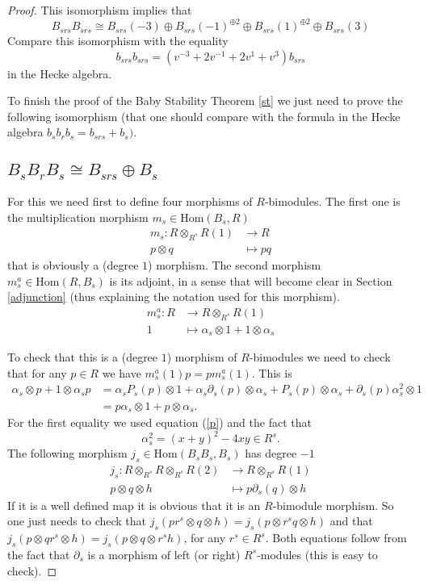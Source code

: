 \documentclass[12pt]{wart}
\theoremstyle{remark}
\def\del{\partial}
\begin{document}
\begin{proof}
This isomorphism implies  that 
\begin{equation}\label{w0}
B_{srs}B_{srs}\cong B_{srs}(-3)\oplus B_{srs}(-1)^{\oplus 2}\oplus B_{srs}(1)^{\oplus 2}\oplus B_{srs}(3)
\end{equation}
Compare this isomorphism with the equality $$b_{srs}b_{srs}=(v^{-3}+2v^{-1}+2v^{1}+v^3)b_{srs}$$ in the Hecke algebra.


To finish the proof of the Baby Stability Theorem \ref{st} we just need to prove the following isomorphism (that one should compare with the formula  in the Hecke algebra $b_sb_rb_s=b_{srs}+b_s).$
\subsection{$B_sB_rB_s\cong B_{srs}\oplus B_s$}\label{dec}
 

 For this we need first to define four morphisms of $R$-bimodules. The first one is the multiplication morphism $m_s\in \mathrm{Hom}(B_s, R)$
\begin{align*}
m_s: R\otimes_{R^s}R(1)&\rightarrow R\\
p\otimes q &\mapsto pq
\end{align*}
that is obviously a (degree $1$) morphism. The second morphism  $m_s^a\in \mathrm{Hom}(R, B_s)$ is its adjoint, in a sense that will become clear in Section \ref{adjunction} (thus explaining the notation  used for this morphism).
\begin{align*}
m_s^a: R &\rightarrow R\otimes_{R^s}R(1)\\
1 &\mapsto \alpha_s\otimes 1+ 1\otimes \alpha_s
\end{align*}

To check that this is  a (degree $1$) morphism of $R$-bimodules we need to check that for any $p\in R$ we have  $m_s^a(1)p=pm_s^a(1).$ This is
\begin{align*}
\alpha_s\otimes p+ 1\otimes \alpha_sp&=\alpha_sP_s(p)\otimes1+\alpha_s\del_s(p)\otimes\alpha_s+P_s(p)\otimes\alpha_s +\del_s(p)\alpha_s^2\otimes1\\
 &= p\alpha_s\otimes 1+p\otimes \alpha_s.
\end{align*}
For the first equality we used equation (\ref{p}) and the fact that $$\alpha_s^2=(x+y)^2-4xy\in R^s.$$
The following  morphism $j_s\in \mathrm{Hom}(B_sB_s, B_s)$ has  degree $-1$
\begin{align*}
j_s: R\otimes_{R^s}R\otimes_{R^s}R(2)&\rightarrow R\otimes_{R^s}R(1)\\
p\otimes q \otimes h&\mapsto p\del_s(q)\otimes h
\end{align*}
If it is a well defined map it is obvious that it is an $R$-bimodule morphism. So one just needs to check that $j_s(pr^s\otimes q \otimes h)=j_s(p\otimes r^s q \otimes h)$ and that $j_s(p\otimes q r^s\otimes h)=j_s(p\otimes  q \otimes r^sh)$, for any $r^s\in R^s.$ Both equations follow from the fact that $\del_s$ is a morphism of left (or right) $R^s$-modules (this is easy to check). 


\end{proof}
\end{document}
